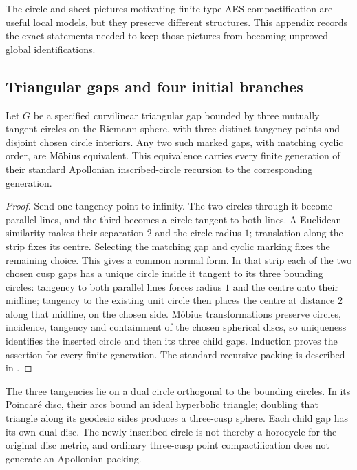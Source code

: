 The circle and sheet pictures motivating finite-type AES compactification are
useful local models, but they preserve different structures.  This appendix
records the exact statements needed to keep those pictures from becoming
unproved global identifications.

\subsection{Triangular gaps and four initial branches}

\begin{proposition}
\label{prop:p0-apollonian-gap-equivalence}
Let $G$ be a specified curvilinear triangular gap bounded by three mutually
tangent circles on the Riemann sphere, with three distinct tangency points
and disjoint chosen circle interiors.  Any two such marked gaps, with matching
cyclic order, are M\"obius equivalent.  This equivalence carries every finite
generation of their standard Apollonian inscribed-circle recursion to the
corresponding generation.
\end{proposition}

\begin{proof}
Send one tangency point to infinity.  The two circles through it become
parallel lines, and the third becomes a circle tangent to both lines.
A Euclidean similarity makes their separation $2$ and the circle radius $1$;
translation along the strip fixes its centre.  Selecting the matching gap
and cyclic marking fixes the remaining choice.  This gives a common normal
form.  In that strip each of the two chosen cusp gaps has a unique circle
inside it tangent to its three bounding circles: tangency to both parallel
lines forces radius $1$ and the centre onto their midline; tangency to the
existing unit circle then places the centre at distance $2$ along that
midline, on the chosen side.  M\"obius transformations preserve
circles, incidence, tangency and containment of the chosen spherical discs,
so uniqueness identifies the inserted circle and then its three child gaps.
Induction proves the assertion for every finite generation.  The standard
recursive packing is described in \cite{GrahamEtAl2005Apollonian}.
\end{proof}

The three tangencies lie on a dual circle orthogonal to the bounding circles.
In its Poincar\'e disc, their arcs bound an ideal hyperbolic triangle; doubling
that triangle along its geodesic sides produces a three-cusp sphere.  Each
child gap has its own dual disc.  The newly inscribed circle is not thereby a
horocycle for the original disc metric, and ordinary three-cusp point
compactification does not generate an Apollonian packing.

